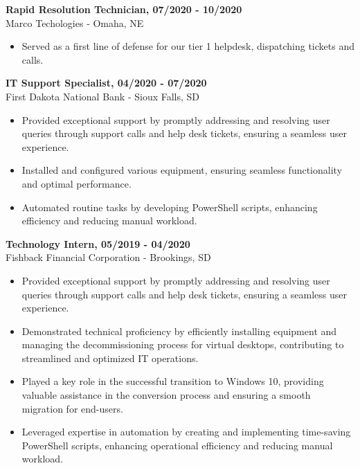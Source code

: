 \documentclass[a4paper,10pt]{article}
\begin{document}
\textbf{Rapid Resolution Technician, 07/2020 - 10/2020} \\
Marco Techologies - Omaha, NE
\begin{itemize}
    \small
    \leftskip=4em
    \item Served as a first line of defense for our tier 1 helpdesk, dispatching tickets and calls.
\end{itemize}
\textbf{IT Support Specialist, 04/2020 - 07/2020} \\
First Dakota National Bank - Sioux Falls, SD
\begin{itemize}
    \small
    \leftskip=4em
	\item Provided exceptional support by promptly addressing and resolving user queries through support calls and help desk tickets, ensuring a seamless user experience.
    \item Installed and configured various equipment, ensuring seamless functionality and optimal performance.
    \item Automated routine tasks by developing PowerShell scripts, enhancing efficiency and reducing manual workload.
\end{itemize}
\textbf{Technology Intern, 05/2019 - 04/2020} \\
Fishback Financial Corporation - Brookings, SD 
\begin{itemize}
    \small
    \leftskip=4em
	\item Provided exceptional support by promptly addressing and resolving user queries through support calls and help desk tickets, ensuring a seamless user experience.
    \item Demonstrated technical proficiency by efficiently installing equipment and managing the decommissioning process for virtual desktops, contributing to streamlined and optimized IT operations.
    \item Played a key role in the successful transition to Windows 10, providing valuable assistance in the conversion process and ensuring a smooth migration for end-users.
    \item Leveraged expertise in automation by creating and implementing time-saving PowerShell scripts, enhancing operational efficiency and reducing manual workload.
\end{itemize}
\end{document}
